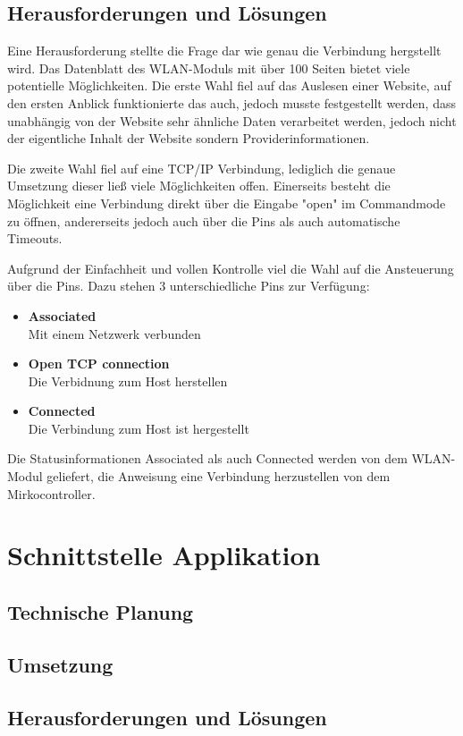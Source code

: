   \subsection{Herausforderungen und Lösungen}
  Eine Herausforderung stellte die Frage dar wie genau die Verbindung hergstellt wird. Das Datenblatt des WLAN-Moduls mit über 100 Seiten bietet viele potentielle Möglichkeiten.
  Die erste Wahl fiel auf das Auslesen einer Website, auf den ersten Anblick funktionierte das auch, jedoch musste festgestellt werden, dass unabhängig von der Website sehr ähnliche
  Daten verarbeitet werden, jedoch nicht der eigentliche Inhalt der Website sondern Providerinformationen.

  Die zweite Wahl fiel auf eine TCP/IP Verbindung, lediglich die genaue Umsetzung dieser ließ viele Möglichkeiten offen. Einerseits besteht die Möglichkeit eine Verbindung direkt
  über die Eingabe "open" im Commandmode zu öffnen, andererseits jedoch auch über die Pins als auch automatische Timeouts.

  Aufgrund der Einfachheit und vollen Kontrolle viel die Wahl auf die Ansteuerung über die Pins.
  Dazu stehen 3 unterschiedliche Pins zur Verfügung:
  \begin{itemize}
    \item \textbf{Associated}\\
    Mit einem Netzwerk verbunden
    \item \textbf{Open TCP connection}\\
    Die Verbidnung zum Host herstellen
    \item \textbf{Connected}\\
    Die Verbindung zum Host ist hergestellt
  \end{itemize}
  Die Statusinformationen Associated als auch Connected werden von dem WLAN-Modul geliefert, die Anweisung eine Verbindung herzustellen von dem Mirkocontroller.

\section{Schnittstelle Applikation}


  \subsection{Technische Planung}

  \subsection{Umsetzung}

  \subsection{Herausforderungen und Lösungen}
